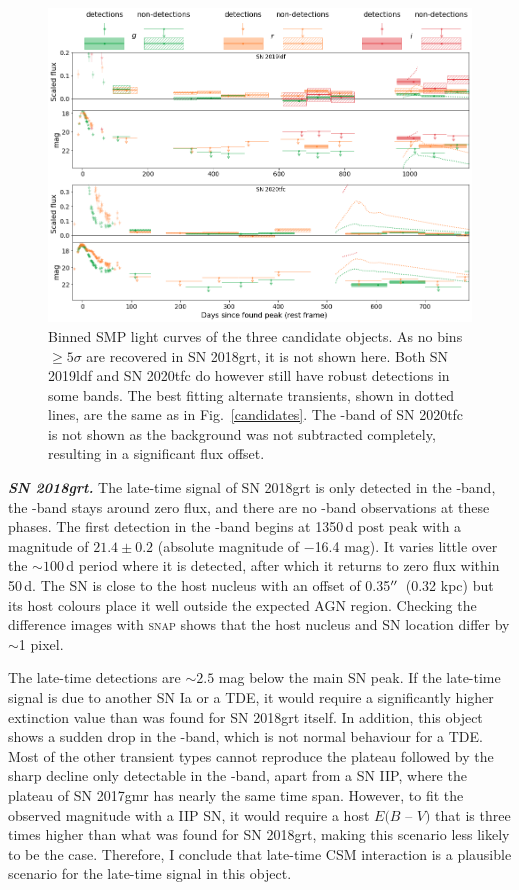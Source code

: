 \documentclass[a4paper,oneside,12pt, class=Latex/Classes/PhDthesisPSnPDF, crop=false]{standalone}
\begin{document}
\begin{figure}
 \centering
 \includegraphics[width=\textwidth]{../Images/chapter_3/candid_plots_smp.png}
 \caption{Binned SMP light curves of the three candidate objects. As no bins $\geq5\sigma$ are recovered in SN 2018grt, it is not shown here. Both SN 2019ldf and SN 2020tfc do however still have robust detections in some bands. The best fitting alternate transients, shown in dotted lines, are the same as in Fig.~\ref{candidates}. The \ztfi-band of SN 2020tfc is not shown as the background was not subtracted completely, resulting in a significant flux offset.}
 \label{final_candid_SMP}
\end{figure}


\textit{\textbf{SN 2018grt.}}
The late-time signal of SN 2018grt is only detected in the \ztfr-band, the \ztfg-band stays around zero flux, and there are no \ztfi-band observations at these phases. The first detection in the \ztfr-band begins at 1350\,d post peak with a magnitude of $21.4\pm0.2$ (absolute magnitude of $-$16.4 mag). It varies little over the $\sim 100$\,d period where it is detected, after which it returns to zero flux within 50\,d. The SN is close to the host nucleus with an offset of 0.35$^{\prime\prime}$~(0.32 kpc) but its host colours place it well outside the expected AGN region. Checking the difference images with \textsc{snap} shows that the host nucleus and SN location differ by $\sim$1 pixel. 

The late-time detections are $\sim 2.5$ mag below the main SN peak. If the late-time signal is due to another SN Ia or a TDE, it would require a significantly higher extinction value than was found for SN 2018grt itself. In addition, this object shows a sudden drop in the \ztfr-band, which is not normal behaviour for a TDE. Most of the other transient types cannot reproduce the plateau followed by the sharp decline only detectable in the \ztfr-band, apart from a SN IIP, where the plateau of SN 2017gmr has nearly the same time span. However, to fit the observed magnitude with a IIP SN, it would require a host $ E(B$ -- $V)$ that is three times higher than what was found for SN 2018grt, making this scenario less likely to be the case. Therefore, I conclude that late-time CSM interaction is a plausible scenario for the late-time signal in this object.
\end{document}

